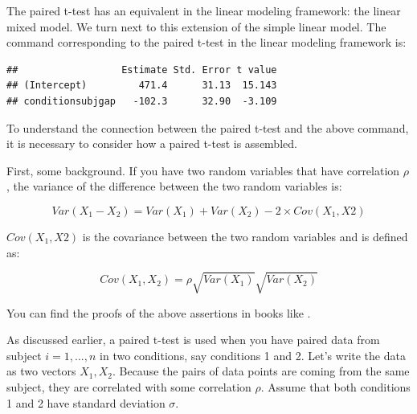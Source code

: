 \documentclass[12pt,]{krantz}
\newenvironment{Shaded}{\begin{snugshade}}{\end{snugshade}}
\newcommand{\DecValTok}[1]{\textcolor[rgb]{0.00,0.00,0.81}{#1}}
\newcommand{\KeywordTok}[1]{\textcolor[rgb]{0.13,0.29,0.53}{\textbf{#1}}}
\newcommand{\NormalTok}[1]{#1}
\newcommand{\OperatorTok}[1]{\textcolor[rgb]{0.81,0.36,0.00}{\textbf{#1}}}
\newcommand{\StringTok}[1]{\textcolor[rgb]{0.31,0.60,0.02}{#1}}
\begin{document}
The paired t-test has an equivalent in the linear modeling framework: the linear mixed model. We turn next to this extension of the simple linear model. The command corresponding to the paired t-test in the linear modeling framework is:

\begin{Shaded}
\end{Shaded}

\begin{verbatim}
##                  Estimate Std. Error t value
## (Intercept)         471.4      31.13  15.143
## conditionsubjgap   -102.3      32.90  -3.109
\end{verbatim}

To understand the connection between the paired t-test and the above command, it is necessary to consider how a paired t-test is assembled.

First, some background. If you have two random variables that have correlation \(\rho\), the variance of the difference between the two random variables is:

\begin{equation}
Var(X_1-X_2)=Var(X_1) + Var(X_2) - 2\times Cov(X_1, X2)
\end{equation}

\(Cov(X_1, X2)\) is the covariance between the two random variables and is defined as:

\begin{equation}
Cov(X_1, X_2) = \rho \sqrt{Var(X_1)}\sqrt{Var(X_2)}
\end{equation}

You can find the proofs of the above assertions in books like \citet{rice1995mathematical}.

As discussed earlier, a paired t-test is used when you have paired data from subject \(i=1,...,n\) in two conditions, say conditions 1 and 2. Let's write the data as two vectors \(X_{1}, X_{2}\). Because the pairs of data points are coming from the same subject, they are correlated with some correlation \(\rho\). Assume that both conditions 1 and 2 have standard deviation \(\sigma\).
\end{document}
